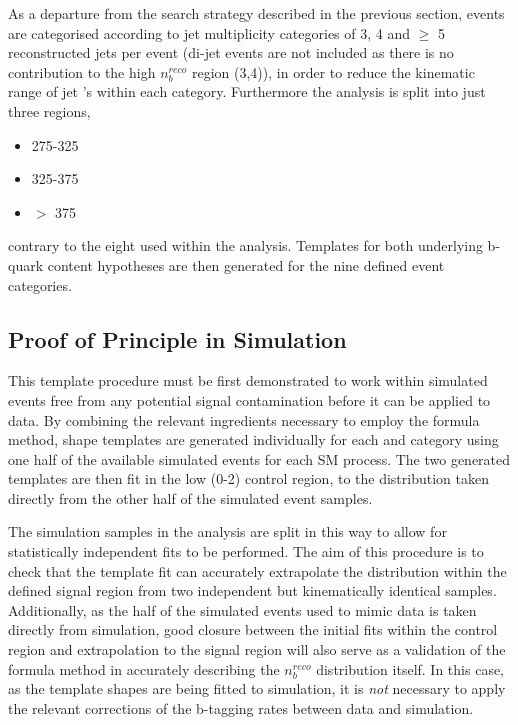 As a departure from the \alphat search strategy described in the previous section, events are categorised according to jet multiplicity categories of 3, 4 and $\geq$ 5 reconstructed jets per event (di-jet events are not included as there is no contribution to the high $n_{b}^{reco}$ region (3,4)), in order to reduce the kinematic range of jet \pt's within each category. Furthermore the analysis is split into just three \theht regions, 

\begin{itemize}
\item 275-325 \GeV
\item 325-375 \GeV
\item $>$ 375 \GeV
\end{itemize}

contrary to the eight used within the \alphat analysis. Templates for both underlying b-quark content hypotheses are then generated for the nine defined event categories.

\subsection{Proof of Principle in Simulation}
\label{subsec:templateclosuretest}

This template procedure must be first demonstrated to work within simulated events free from any potential signal contamination before it can be applied to data. By combining the relevant ingredients necessary to employ the formula method, \nbreco shape templates are generated individually for each \njet and \theht category using one half of the available simulated events for each \ac{SM} process. The two generated templates are then fit in the low \nbreco (0-2) control region, to the \nbreco distribution taken directly from the other half of the simulated event samples. 

The simulation samples in the analysis are split in this way to allow for statistically independent fits to be performed. The aim of this procedure is to check that the template fit can accurately extrapolate the \nbreco distribution within the defined signal region from two independent but kinematically identical samples. Additionally, as the half of the simulated events used to mimic data is taken directly from simulation, good closure between the initial fits within the control region and extrapolation to the signal region will also serve as a validation of the formula method in accurately describing the $n_{b}^{reco}$ distribution itself. In this case, as the template shapes are being fitted to simulation, it is \emph{not} necessary to apply the relevant corrections of the b-tagging rates between data and simulation. 

